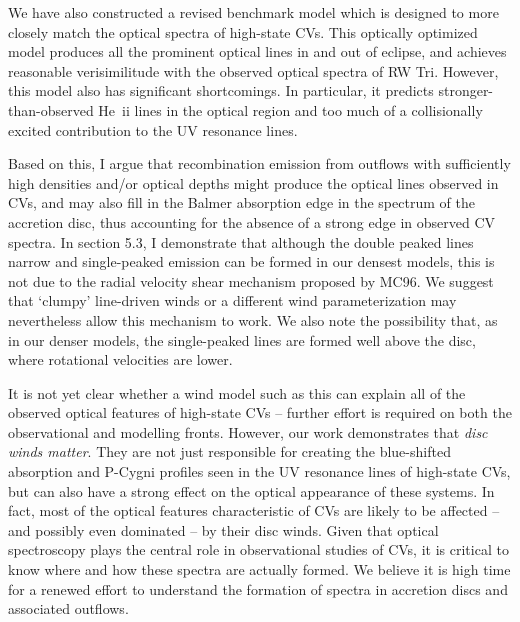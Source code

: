 We have also constructed a revised benchmark model which is designed
to more closely match the optical spectra of high-state CVs. This
optically optimized model produces all the prominent optical lines in
and out of eclipse, and achieves reasonable verisimilitude with the
observed optical spectra of RW Tri. However, this model also has
significant shortcomings. In particular, it predicts
stronger-than-observed He~{\sc ii} lines in the optical region and too
much of a collisionally excited contribution to the UV resonance lines. 

Based on this, I argue that recombination emission 
from outflows with sufficiently high densities and/or optical depths 
might produce the optical lines observed in CVs, and may also 
fill in the Balmer absorption edge in the spectrum of the accretion disc, 
thus accounting for the absence of a strong edge in observed CV spectra.
In section 5.3, I demonstrate that
although the double peaked lines narrow and 
single-peaked emission can be formed in our densest models, 
this is not due to the radial velocity shear mechanism proposed by MC96.
We suggest that `clumpy' line-driven winds or a different
wind parameterization may nevertheless allow this mechanism to work.
We also note the possibility that, as in our denser models, 
the single-peaked lines are formed well above the disc, where 
rotational velocities are lower.

It is not yet clear whether a wind model such as this can
explain all of the observed optical features of high-state CVs --
further effort is required on both the observational
and modelling fronts.
However, our work demonstrates that {\sl disc winds matter}. They are
not just responsible for creating the blue-shifted absorption and
P-Cygni profiles seen in the UV resonance lines of high-state CVs, but
can also have a strong effect on the optical appearance of these
systems. In fact, most of the optical features characteristic of CVs
are likely to be affected -- and possibly even dominated -- by their disc
winds. Given that optical spectroscopy plays the central role in
observational studies of CVs, it is critical to know 
where and how these spectra are actually formed. We believe it is high
time for a renewed effort to understand the formation of spectra in
accretion discs and associated outflows. 


